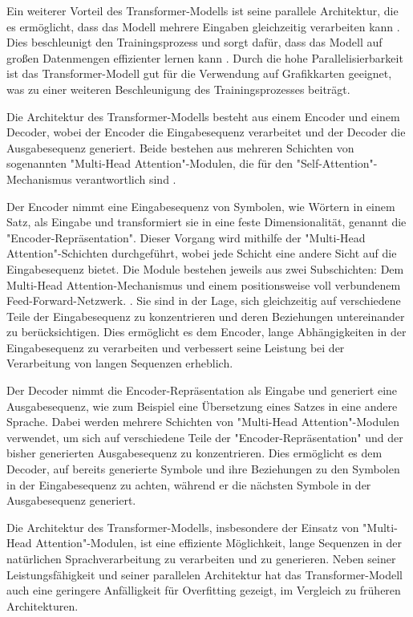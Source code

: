 \documentclass[oneside,bibliography=totocnumbered,BCOR=5mm]{scrbook}%
\theoremstyle{definition}
\theoremstyle{definition}
\theoremstyle{definition}
\theoremstyle{definition}
\theoremstyle{definition}
\theoremstyle{definition}
\begin{document}
Ein weiterer Vorteil des Transformer-Modells ist seine parallele Architektur, die es ermöglicht, 
dass das Modell mehrere Eingaben gleichzeitig verarbeiten kann \autocite[Seite 2]{transformer}. 
Dies beschleunigt den Trainingsprozess und sorgt dafür, dass das Modell
auf großen Datenmengen effizienter lernen kann \autocite[Seite 8]{transformer}. 
Durch die hohe Parallelisierbarkeit ist das Transformer-Modell gut für die Verwendung auf Grafikkarten geeignet, 
was zu einer weiteren Beschleunigung des Trainingsprozesses beiträgt.


Die Architektur des Transformer-Modells besteht aus einem Encoder und einem Decoder, 
wobei der Encoder die Eingabesequenz verarbeitet und der Decoder die Ausgabesequenz generiert. 
Beide bestehen aus mehreren Schichten von sogenannten "Multi-Head Attention"-Modulen, die für den "Self-Attention"-Mechanismus verantwortlich sind \autocite[Seite 3]{transformer}. 


Der Encoder nimmt eine Eingabesequenz von Symbolen, wie Wörtern in einem Satz, 
als Eingabe und transformiert sie in eine feste Dimensionalität, genannt die "Encoder-Repräsentation". 
Dieser Vorgang wird mithilfe der "Multi-Head Attention"-Schichten durchgeführt, wobei jede Schicht eine andere Sicht auf die Eingabesequenz bietet. 
Die Module bestehen jeweils aus zwei Subschichten: Dem Multi-Head Attention-Mechanismus und einem positionsweise voll verbundenem Feed-Forward-Netzwerk. \autocite[Seite 3]{transformer}.
Sie sind in der Lage, sich gleichzeitig auf verschiedene Teile der Eingabesequenz zu konzentrieren und deren Beziehungen untereinander zu berücksichtigen. 
Dies ermöglicht es dem Encoder, lange Abhängigkeiten in der Eingabesequenz zu verarbeiten und verbessert seine Leistung bei der Verarbeitung von langen Sequenzen erheblich.


Der Decoder nimmt die Encoder-Repräsentation als Eingabe und generiert eine Ausgabesequenz, wie zum Beispiel eine Übersetzung eines Satzes in eine andere Sprache. 
Dabei werden mehrere Schichten von "Multi-Head Attention"-Modulen verwendet, um sich auf verschiedene Teile der "Encoder-Repräsentation" und der bisher generierten Ausgabesequenz zu konzentrieren. 
Dies ermöglicht es dem Decoder, auf bereits generierte Symbole und ihre Beziehungen zu den Symbolen in der Eingabesequenz zu achten, während er die nächsten Symbole in der Ausgabesequenz generiert.


Die Architektur des Transformer-Modells, insbesondere der Einsatz von "Multi-Head Attention"-Modulen, ist eine effiziente Möglichkeit, 
lange Sequenzen in der natürlichen Sprachverarbeitung zu verarbeiten und zu generieren. 
Neben seiner Leistungsfähigkeit und seiner parallelen Architektur hat das 
Transformer-Modell auch eine geringere Anfälligkeit für Overfitting gezeigt, 
im Vergleich zu früheren Architekturen. 
\end{document}
